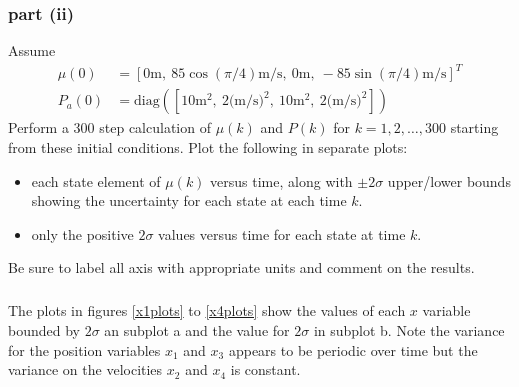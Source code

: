 \documentclass[11pt]{article}
\begin{document}
\subsubsection*{part (ii)}
Assume
\begin{align*}
	\mu(0) &= [0\text{m},\ 85\cos(\pi/4)\text{m/s},\ 0\text{m},\ -85\sin(\pi/4)\text{m/s}]^T \\
	P_a(0) &= \text{diag}([10\text{m}^2,\ 2\text{(m/s)}^2,\ 10\text{m}^2,\ 2\text{(m/s)}^2])
\end{align*}
Perform a 300 step calculation of $\mu(k)$ and $P(k)$ for $k=1,2,\dots,300$ starting from these initial conditions. Plot the following in separate plots:
\begin{itemize}
	\item each state element of $\mu(k)$ versus time, along with $\pm2\sigma$ upper/lower bounds showing the uncertainty for each state at each time $k$.
	\item only the positive $2\sigma$ values versus time for each state at time $k$.
\end{itemize}
Be sure to label all axis with appropriate units and comment on the results.

\subparagraph*{}
The plots in figures \ref{x1plots} to \ref{x4plots} show the values of each $x$ variable bounded by $2\sigma$ an subplot a and the value for $2\sigma$ in subplot b. Note the variance for the position variables $x_1$ and $x_3$ appears to be periodic over time but the variance on the velocities $x_2$ and $x_4$ is constant.
\end{document}
